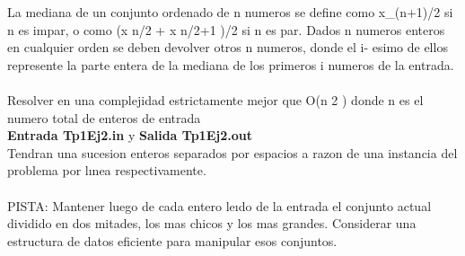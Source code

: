 La mediana de un conjunto ordenado de n numeros se define como x\_{(n+1)/2} si n es impar, o como
(x n/2 + x n/2+1 )/2 si n es par. Dados n numeros enteros en cualquier orden se deben devolver otros n
numeros, donde el i- esimo de ellos represente la parte entera de la mediana de los primeros i numeros de
la entrada.\\\\
Resolver en una complejidad estrictamente mejor que O(n 2 ) donde n es el numero total de enteros de
entrada\\
\textbf{Entrada Tp1Ej2.in} y \textbf{Salida Tp1Ej2.out}\\
Tendran una sucesion enteros separados por espacios a razon de una instancia del problema por lınea
respectivamente.\\\\
PISTA: Mantener luego de cada entero leıdo de la entrada el conjunto actual dividido en dos mitades, los
mas chicos y los mas grandes. Considerar una estructura de datos eficiente para manipular esos conjuntos.\\